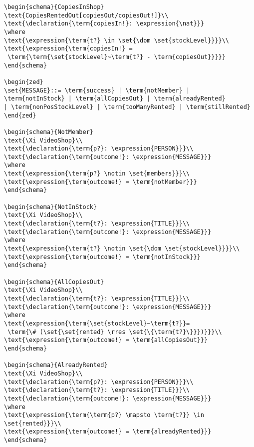 \begin{verbatim}
\begin{schema}{CopiesInShop}
\text{CopiesRentedOut[copiesOut/copiesOut!]}\\
\text{\declaration{\term{copiesIn!}: \expression{\nat}}}
\where
\text{\expression{\term{t?} \in \set{\dom \set{stockLevel}}}}\\
\text{\expression{\term{copiesIn!} =
 \term{\term{\set{stockLevel}~\term{t?} - \term{copiesOut}}}}}
\end{schema}

\begin{zed}
\set{MESSAGE}::= \term{success} | \term{notMember} | 
\term{notInStock} | \term{allCopiesOut} | \term{alreadyRented} 
| \term{nonPosStockLevel} | \term{tooManyRented} | \term{stillRented}
\end{zed}

\begin{schema}{NotMember}
\text{\Xi VideoShop}\\
\text{\declaration{\term{p?}: \expression{PERSON}}}\\
\text{\declaration{\term{outcome!}: \expression{MESSAGE}}}
\where
\text{\expression{\term{p?} \notin \set{members}}}\\
\text{\expression{\term{outcome!} = \term{notMember}}}
\end{schema}

\begin{schema}{NotInStock}
\text{\Xi VideoShop}\\
\text{\declaration{\term{t?}: \expression{TITLE}}}\\
\text{\declaration{\term{outcome!}: \expression{MESSAGE}}}
\where
\text{\expression{\term{t?} \notin \set{\dom \set{stockLevel}}}}\\
\text{\expression{\term{outcome!} = \term{notInStock}}}
\end{schema}

\begin{schema}{AllCopiesOut}
\text{\Xi VideoShop}\\
\text{\declaration{\term{t?}: \expression{TITLE}}}\\
\text{\declaration{\term{outcome!}: \expression{MESSAGE}}}
\where
\text{\expression{\term{\set{stockLevel}~\term{t?}}=
 \term{\# (\set{\set{rented} \rres \set{\{\term{t?}\}}})}}}\\
\text{\expression{\term{outcome!} = \term{allCopiesOut}}}
\end{schema}

\begin{schema}{AlreadyRented}
\text{\Xi VideoShop}\\
\text{\declaration{\term{p?}: \expression{PERSON}}}\\
\text{\declaration{\term{t?}: \expression{TITLE}}}\\
\text{\declaration{\term{outcome!}: \expression{MESSAGE}}}
\where
\text{\expression{\term{\term{p?} \mapsto \term{t?}} \in \set{rented}}}\\
\text{\expression{\term{outcome!} = \term{alreadyRented}}}
\end{schema}


\end{verbatim}

